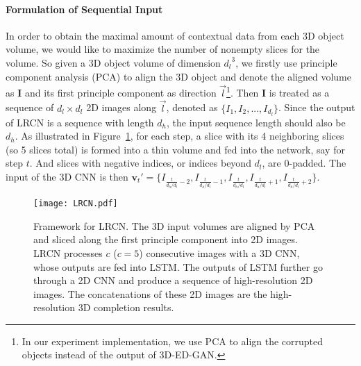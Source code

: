 \documentclass[10pt,twocolumn,letterpaper]{article}
\begin{document}
\paragraph*{Formulation of Sequential Input} In order to obtain the maximal amount of contextual data from each 3D object volume, we would like to maximize the number of nonempty slices for the volume. So given a 3D object volume of dimension ${d_l}^3$, we firstly use principle component analysis (PCA) to align the 3D object and denote the aligned volume as $\mathbf{I}$ and its first principle component as direction $\overrightarrow{l}$\footnote{In our experiment implementation, we use PCA to align the corrupted objects instead of the output of 3D-ED-GAN.}. Then $\mathbf{I}$ is treated as a sequence of $d_l\times d_l$ 2D images along $\overrightarrow{l}$, denoted as $\{I_1, I_2,..., I_{d_l}\}$. Since the output of LRCN is a sequence with length $d_h$, the input sequence length should also be $d_h$. As illustrated in Figure~\ref{fig:LRCN}, for each step, a slice with its 4 neighboring slices (so 5 slices total) is formed into a thin volume and fed into the network, say for step $t$. And slices with negative indices, or indices beyond $d_l$, are 0-padded. The input of the 3D CNN is then $\mathbf{v}_t' = \{ I_{{\frac{t}{d_h/d_l} }- 2},I_{{\frac{t}{d_h/d_l} }-1},I_{\frac{t}{d_h/d_l} },I_{{\frac{t}{d_h/d_l} }+1},I_{{\frac{t}{d_h/d_l} }+2} \}$.
\begin{figure}[t]
    \texttt{[image: LRCN.pdf]}
    \caption{Framework for LRCN. The 3D input volumes are aligned by PCA and sliced along the first principle component into 2D images. LRCN processes $c$ ($c=5$) consecutive images with a 3D CNN, whose outputs are fed into LSTM. The outputs of LSTM further go through a 2D CNN and produce a sequence of high-resolution 2D images. The concatenations of these 2D images are the high-resolution 3D completion results.}
    \label{fig:LRCN}
\end{figure}
\end{document}

